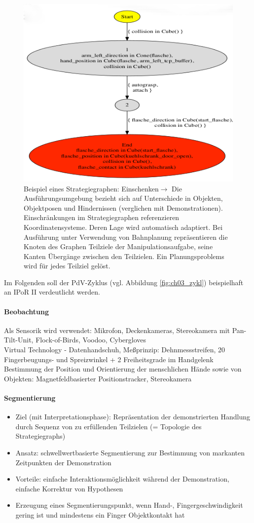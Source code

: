 \begin{figure}[ht]\centering 
\includegraphics[width=0.6\linewidth]{figures/ch03_strategiegraph.png}
\caption{Beispiel eines Strategiegraphen: \Gu Einschenken\Go $\rightarrow$ Die Ausführungsumgebung bezieht sich auf Unterschiede in Objekten,
Objektposen und Hindernissen (verglichen mit Demonstrationen). Einschränkungen im Strategiegraphen referenzieren Koordinatensysteme. Deren Lage wird automatisch adaptiert. Bei Ausführung unter Verwendung von Bahnplanung repräsentieren die Knoten des Graphen Teilziele der Manipulationsaufgabe, seine Kanten Übergänge zwischen den Teilzielen. Ein Planungsproblems wird für jedes Teilziel gelöst.}
\label{fig:ch03_stratgra}
\end{figure}

\noindent
Im Folgenden soll der PdV-Zyklus (vgl. Abbildung \ref{fig:ch03_zykl}) beispielhaft an IPoR II 
verdeutlicht werden. %
\paragraph*{Beobachtung} Als Sensorik wird verwendet: Mikrofon, Deckenkameras, Stereokamera mit Pan-Tilt-Unit, Flock-of-Birds, Voodoo, Cybergloves\\
Virtual Technology - Datenhandschuh, Meßprinzip: Dehnmessstreifen, 20 Fingerbeugungs- und Spreizwinkel + 2 Freiheitsgrade im Handgelenk\\
Bestimmung der Position und Orientierung der menschlichen Hände sowie von Objekten: Magnetfeldbasierter Positionstracker, Stereokamera

\paragraph*{Segmentierung}
\begin{itemize}
\item Ziel (mit Interpretationsphase): Repräsentation der demonstrierten Handlung durch Sequenz von zu
erfüllenden Teilzielen (= Topologie des Strategiegraphs)
\item Ansatz: schwellwertbasierte Segmentierung zur Bestimmung von markanten Zeitpunkten der Demonstration
\item Vorteile: einfache Interaktionsmöglichkeit während der Demonstration, einfache Korrektur von Hypothesen
\item Erzeugung eines Segmentierungspunkt, wenn Hand-, Fingergeschwindigkeit gering ist und mindestens ein Finger Objektkontakt %
hat
\end{itemize}

